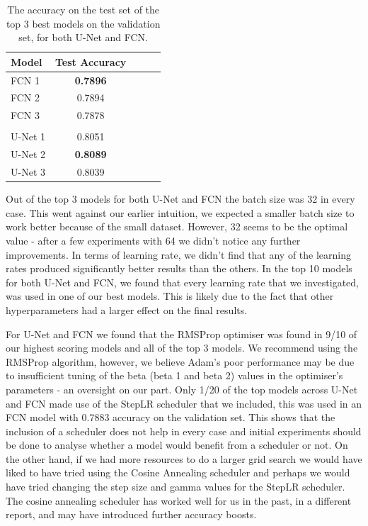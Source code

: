\documentclass{article}
\begin{document}
\begin{table}[htbp]
\vskip 3mm
\begin{center}
\begin{small}
\begin{sc}
\begin{tabular}{lcccr}
\hline
\abovespace\belowspace
Model & Test Accuracy \\
\hline
\abovespace
FCN 1 & \textbf{0.7896} \\ 
FCN 2 & 0.7894 \\
FCN 3 & 0.7878 \\
\\
U-Net 1 & 0.8051 \\
U-Net 2 & \textbf{0.8089} \\
\belowspace
U-Net 3 & 0.8039\\
\hline
\end{tabular}
\end{sc}
\end{small}
\caption{The accuracy on the test set of the top 3 best models on the validation set, for both U-Net and FCN.}
\label{tab:best_models}
\end{center}
\vskip -3mm
\end{table}

Out of the top 3 models for both U-Net and FCN the batch size was 32 in every case. This went against our earlier intuition, we expected a smaller batch size to work better because of the small dataset. However, 32 seems to be the optimal value - after a few experiments with 64 we didn't notice any further improvements. In terms of learning rate, we didn't find that any of the learning rates produced significantly better results than the others. In the top 10 models for both U-Net and FCN, we found that every learning rate that we investigated, was used in one of our best models. This is likely due to the fact that other hyperparameters had a larger effect on the final results.

For U-Net and FCN we found that the RMSProp optimiser was found in 9/10 of our highest scoring models and all of the top 3 models. We recommend using the RMSProp algorithm, however, we believe Adam's poor performance  may be due to insufficient tuning of the beta (beta 1 and beta 2) values in the optimiser's parameters - an oversight on our part. Only 1/20 of the top models across U-Net and FCN made use of the StepLR scheduler that we included, this was used in an FCN model with 0.7883 accuracy on the validation set. This shows that the inclusion of a scheduler does not help in every case and initial experiments should be done to analyse whether a model would benefit from a scheduler or not. On the other hand, if we had more resources to do a larger grid search we would have liked to have tried using the Cosine Annealing scheduler and perhaps we would have tried changing the step size and gamma values for the StepLR scheduler. The cosine annealing scheduler has worked well for us in the past, in a different report, and may have introduced further accuracy boosts. 
\end{document}
